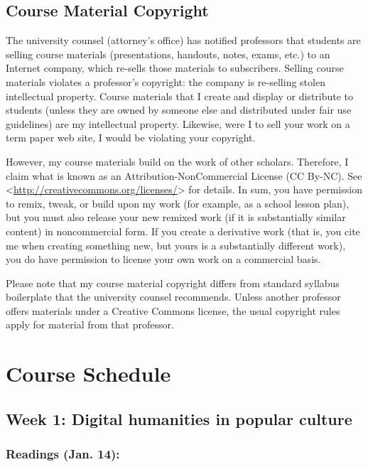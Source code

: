 \documentclass[]{article}
\begin{document}
\subsection{Course Material Copyright}\label{course-material-copyright}

The university counsel (attorney's office) has notified professors that
students are selling course materials (presentations, handouts, notes,
exams, etc.) to an Internet company, which re-sells those materials to
subscribers. Selling course materials violates a professor's copyright:
the company is re-selling stolen intellectual property. Course materials
that I create and display or distribute to students (unless they are
owned by someone else and distributed under fair use guidelines) are my
intellectual property. Likewise, were I to sell your work on a term
paper web site, I would be violating your copyright.

However, my course materials build on the work of other scholars.
Therefore, I claim what is known as an Attribution-NonCommercial License
(CC By-NC). See
\textless{}\url{http://creativecommons.org/licenses/}\textgreater{} for
details. In sum, you have permission to remix, tweak, or build upon my
work (for example, as a school lesson plan), but you must also release
your new remixed work (if it is substantially similar content) in
noncommercial form. If you create a derivative work (that is, you cite
me when creating something new, but yours is a substantially different
work), you do have permission to license your own work on a commercial
basis.

Please note that my course material copyright differs from standard
syllabus boilerplate that the university counsel recommends. Unless
another professor offers materials under a Creative Commons license, the
usual copyright rules apply for material from that professor.

\section{Course Schedule}\label{course-schedule}

\subsection{Week 1: Digital humanities in popular
culture}\label{week-1-digital-humanities-in-popular-culture}

\subsubsection{Readings (Jan. 14):}\label{readings-jan.-14}
\end{document}
